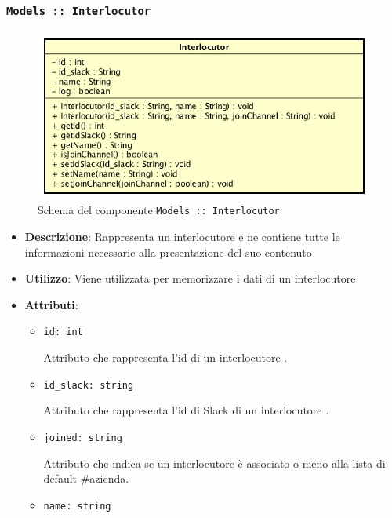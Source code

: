 \documentclass[../DefinizioneDiProdotto.tex]{subfiles}
\begin{document}
\begin{itemize}
	\newpage
	\subsubsection{\texttt{Models :: Interlocutor}}
	\begin{figure}[!h]
		\centering
		\includegraphics[scale=0.7]{Architettura/Models/Interlocutor.png}
		\caption{Schema del componente \texttt{Models :: Interlocutor}}
	\end{figure}
	\begin{itemize}\item \textbf{Descrizione}: Rappresenta un interlocutore e ne contiene tutte le informazioni necessarie alla presentazione del suo contenuto
	\item \textbf{Utilizzo}: Viene utilizzata per memorizzare i dati di un interlocutore
	\item \textbf{Attributi}:
	\begin{itemize}
	\item \texttt{id: int}\

	 Attributo che rappresenta l'id di un interlocutore
	.
	\end{itemize}
	\begin{itemize}
	\item \texttt{id\_slack: string}\

	 Attributo che rappresenta l'id di Slack di un interlocutore
	.
	\end{itemize}
	\begin{itemize}
	\item \texttt{joined: string}\

	 Attributo che indica se un interlocutore è associato o meno alla lista di default \#azienda.
	\end{itemize}
	\begin{itemize}
	\item \texttt{name: string}\


\end{itemize}
\end{itemize}
\end{itemize}
\end{document}

